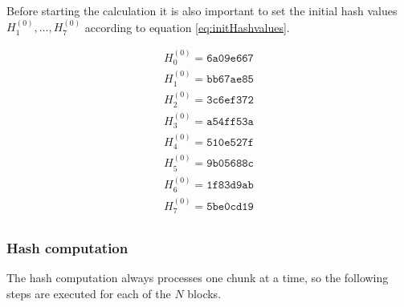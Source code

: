 Before starting the calculation it is also important to set the initial hash values $H_1^{(0)},\dots,H_7^{(0)}$ according to equation \eqref{eq:initHashvalues}.

\begin{equation}
\label{eq:initHashvalues}
	\begin{array}{l}
	H_{0}^{(0)}= \texttt{6a09e667} \\
	H_{1}^{(0)}= \texttt{bb67ae85} \\
	H_{2}^{(0)}= \texttt{3c6ef372} \\
	H_{3}^{(0)}= \texttt{a54ff53a} \\
	H_{4}^{(0)}= \texttt{510e527f} \\
	H_{5}^{(0)}= \texttt{9b05688c} \\
	H_{6}^{(0)}= \texttt{1f83d9ab} \\
	H_{7}^{(0)}= \texttt{5be0cd19} \\
	\end{array}	
\end{equation}

\subsubsection*{Hash computation}

The hash computation always processes one chunk at a time, so the following steps are executed for each of the $N$ blocks. 


